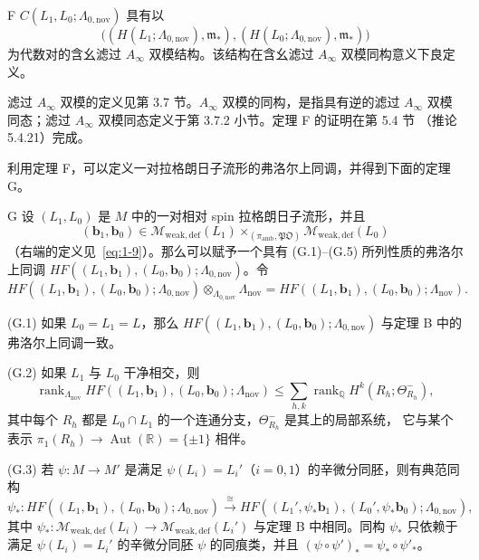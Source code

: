 \begin{theorem}{F}\label{thm:F}
$C(L_1,L_0;\Lambda_{0,\mathrm{nov}})$ 具有以
\[
  \bigl((H(L_1;\Lambda_{0,\mathrm{nov}}),\mathfrak m_*),
  (H(L_0;\Lambda_{0,\mathrm{nov}}),\mathfrak m_*)\bigr)
\]
为代数对的含幺滤过 $A_\infty$ 双模结构。该结构在含幺滤过 $A_\infty$ 双模同构意义下良定义。
\end{theorem}

滤过 $A_\infty$ 双模的定义见第 3.7 节。$A_\infty$ 双模的同构，是指具有逆的滤过
$A_\infty$ 双模同态；滤过 $A_\infty$ 双模同态定义于第 3.7.2 小节。定理 F 的证明在第 5.4 节
（推论 5.4.21）完成。

利用定理 F，可以定义一对拉格朗日子流形的弗洛尔上同调，并得到下面的定理 G。

\begin{theorem}{G}\label{thm:G}
设 $(L_1,L_0)$ 是 $M$ 中的一对相对 spin 拉格朗日子流形，并且
\[
  (\mathbf b_1,\mathbf b_0)\in
  \mathcal M_{\mathrm{weak,def}}(L_1)
  \mathbin{\times_{(\pi_{\mathrm{amb}},\mathfrak{PO})}}
  \mathcal M_{\mathrm{weak,def}}(L_0)
\]
（右端的定义见~\eqref{eq:1-9}）。那么可以赋予一个具有 (G.1)--(G.5) 所列性质的弗洛尔
上同调 $HF((L_1,\mathbf b_1),(L_0,\mathbf b_0);\Lambda_{0,\mathrm{nov}})$。令
\[
  HF((L_1,\mathbf b_1),(L_0,\mathbf b_0);\Lambda_{0,\mathrm{nov}})
  \otimes_{\Lambda_{0,\mathrm{nov}}}\Lambda_{\mathrm{nov}}
  =HF((L_1,\mathbf b_1),(L_0,\mathbf b_0);\Lambda_{\mathrm{nov}}).
\]

\textup{(G.1)} 如果 $L_0=L_1=L$，那么
$HF((L_1,\mathbf b_1),(L_0,\mathbf b_0);\Lambda_{0,\mathrm{nov}})$ 与定理 B 中的弗洛尔上同调一致。

\textup{(G.2)} 如果 $L_1$ 与 $L_0$ 干净相交，则
\[
  \operatorname{rank}_{\Lambda_{\mathrm{nov}}}
  HF((L_1,\mathbf b_1),(L_0,\mathbf b_0);\Lambda_{\mathrm{nov}})
  \leq\sum_{h,k}\operatorname{rank}_{\mathbb Q}
  H^k(R_h;\Theta^-_{R_h}),
\]
其中每个 $R_h$ 都是 $L_0\cap L_1$ 的一个连通分支，$\Theta^-_{R_h}$ 是其上的局部系统，
它与某个表示
$\pi_1(R_h)\to\operatorname{Aut}(\mathbb R)=\{\pm1\}$ 相伴。

\textup{(G.3)} 若 $\psi\colon M\to M'$ 是满足
$\psi(L_i)=L_i'$（$i=0,1$）的辛微分同胚，则有典范同构
\[
  \psi_*\colon
  HF((L_1,\mathbf b_1),(L_0,\mathbf b_0);\Lambda_{0,\mathrm{nov}})
  \xrightarrow{\ \cong\ }
  HF((L_1',\psi_*\mathbf b_1),(L_0',\psi_*\mathbf b_0);\Lambda_{0,\mathrm{nov}}),
\]
其中 $\psi_*\colon\mathcal M_{\mathrm{weak,def}}(L_i)\to
\mathcal M_{\mathrm{weak,def}}(L_i')$ 与定理 B 中相同。同构 $\psi_*$ 只依赖于满足
$\psi(L_i)=L_i'$ 的辛微分同胚 $\psi$ 的同痕类，并且
$(\psi\circ\psi')_*=\psi_*\circ\psi'_* $。


\end{theorem}
